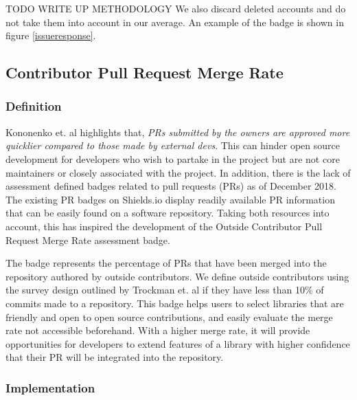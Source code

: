 \documentclass[12pt, letterpaper]{article}
\begin{document}
TODO WRITE UP METHODOLOGY
We also discard deleted accounts and do not take them into account in our average.
An example of the badge is shown in figure \ref{issueresponse}.


\subsection{Contributor Pull Request Merge Rate}
\subsubsection{Definition}
Kononenko et. al \cite{shopifyarticle} highlights that, \textit{PRs submitted by the owners are approved more
quicklier compared to those made by external devs}. This can hinder open source development
for developers who wish to partake in the project but are not core maintainers or closely associated with the project.
In addition, there is the lack of assessment defined badges \cite{githubbadges} related to pull requests (PRs)
as of December 2018.
The existing PR badges on Shields.io \cite{shields} display readily available PR information that can be easily found on a 
software repository. Taking both resources \cite{shields, shopifyarticle} into account, this has inspired
the development of the Outside Contributor Pull Request Merge Rate assessment badge. 


The badge represents the percentage of PRs that have been merged into the repository authored by outside contributors.
We define outside contributors using the survey design outlined by Trockman et. al \cite{githubbadges} if they have 
less than 10\% of commits made to a repository.
This badge helps users to select libraries that are friendly and open to open source contributions,
and easily evaluate the merge rate not accessible beforehand.
With a higher merge rate, it will provide opportunities for developers to extend features of a library with 
higher confidence that their PR will be integrated into the repository.

\subsubsection{Implementation}
\end{document}
